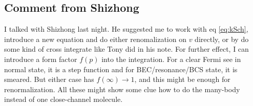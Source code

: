 \subsection{Comment from Shizhong}
I talked with Shizhong last night.  He suggested me to work with eq \eqref{eq:kSch}, introduce a new equation and do either renomalization on $v$ directly, or by do some kind of cross integrate like Tony did in his note.  For further effect, I can introduce a form factor $f(p)$ into the integration.  For a clear Fermi see in normal state, it is a step function and for BEC/resonance/BCS state, it is smeared.  But either case has $f(\infty)\rightarrow1$, and this might be enough for renormalization.  All these might show some clue how to do the many-body instead of one close-channel molecule.  